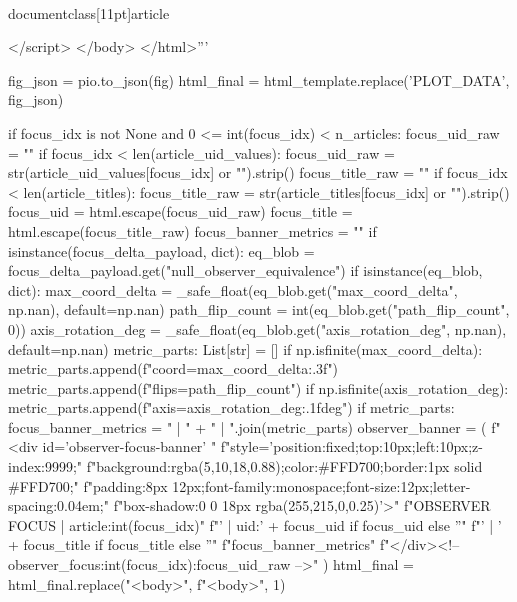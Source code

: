 \\documentclass[11pt]{article}
\begin{document}
\begin{CodeBlock}
{{{{{{    </script>
</body>
</html>'''

    fig_json = pio.to_json(fig)
    html_final = html_template.replace('{PLOT_DATA}', fig_json)

    if focus_idx is not None and 0 <= int(focus_idx) < n_articles:
        focus_uid_raw = ""
        if focus_idx < len(article_uid_values):
            focus_uid_raw = str(article_uid_values[focus_idx] or "").strip()
        focus_title_raw = ""
        if focus_idx < len(article_titles):
            focus_title_raw = str(article_titles[focus_idx] or "").strip()
        focus_uid = html.escape(focus_uid_raw)
        focus_title = html.escape(focus_title_raw)
        focus_banner_metrics = ""
        if isinstance(focus_delta_payload, dict):
            eq_blob = focus_delta_payload.get("null_observer_equivalence")
            if isinstance(eq_blob, dict):
                max_coord_delta = _safe_float(eq_blob.get("max_coord_delta", np.nan), default=np.nan)
                path_flip_count = int(eq_blob.get("path_flip_count", 0))
                axis_rotation_deg = _safe_float(eq_blob.get("axis_rotation_deg", np.nan), default=np.nan)
                metric_parts: List[str] = []
                if np.isfinite(max_coord_delta):
                    metric_parts.append(f"coord={max_coord_delta:.3f}")
                metric_parts.append(f"flips={path_flip_count}")
                if np.isfinite(axis_rotation_deg):
                    metric_parts.append(f"axis={axis_rotation_deg:.1f}deg")
                if metric_parts:
                    focus_banner_metrics = " | " + " | ".join(metric_parts)
        observer_banner = (
            f"<div id='observer-focus-banner' "
            f"style='position:fixed;top:10px;left:10px;z-index:9999;"
            f"background:rgba(5,10,18,0.88);color:#FFD700;border:1px solid #FFD700;"
            f"padding:8px 12px;font-family:monospace;font-size:12px;letter-spacing:0.04em;"
            f"box-shadow:0 0 18px rgba(255,215,0,0.25)'>"
            f"OBSERVER FOCUS | article:{int(focus_idx)}"
            f"{' | uid:' + focus_uid if focus_uid else ''}"
            f"{' | ' + focus_title if focus_title else ''}"
            f"{focus_banner_metrics}"
            f"</div><!-- observer_focus:{int(focus_idx)}:{focus_uid_raw} -->"
        )
        html_final = html_final.replace("<body>", f"<body>\n", 1)

}}}}}}
\end{CodeBlock}
\end{document}
